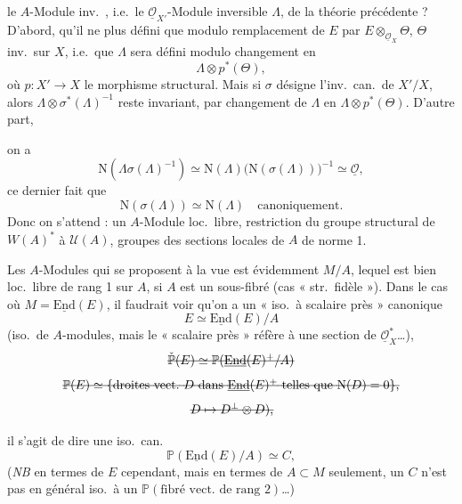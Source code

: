 \documentclass[11pt,a4paper]{article}
\begin{document}
 le $A$-Module inv.\ , i.e.\ le $\underline{\mathcal{O}}_{X'}$-Module inversible $\Lambda$, de la théorie précédente ?  D'abord, qu'il ne  plus défini que modulo remplacement de $E$ par $E \otimes_{\underline{\mathcal{O}}_X} \Theta$, $\Theta$ inv.\ sur $X$, i.e.\ que $\Lambda$ sera défini modulo changement en
\[
  \Lambda \otimes p^{*}(\Theta),
\]
où $p \colon X' \to X$ le morphisme structural. Mais si $\sigma$ désigne l'inv.\ can.\ de $X'/X$, alors $\Lambda \otimes \sigma^{*}(\Lambda)^{-1}$ reste invariant, par changement de $\Lambda$ en $\Lambda \otimes p^{*}(\Theta)$. D'autre part,

on a
\[
  \mathrm{N}(\Lambda \sigma(\Lambda)^{-1}) \simeq \mathrm{N}(\Lambda)\bigl(\mathrm{N}(\sigma(\Lambda))\bigr)^{-1} \simeq \underline{\mathcal{O}} ,
\]
 ce dernier fait que
\[
  \mathrm{N}(\sigma(\Lambda)) \simeq \mathrm{N}(\Lambda) \quad \text{canoniquement.}
\]
Donc on s'attend :  un $A$-Module loc.\ libre,  restriction du groupe structural de $W(A)^{*}$ à $\mathcal{U}(A)$,  groupes des sections locales de $A$ de norme 1.

Les $A$-Modules qui se proposent à la vue est évidemment $M/A$, lequel est bien loc.\ libre de rang 1 sur $A$, si $A$ est un sous-fibré   (cas « str.\ fidèle »).  Dans le cas où $M = \underline{\mathrm{End}}(E)$, il faudrait voir qu'on a un « iso.\ à scalaire près » canonique
\[
  E \simeq \underline{\mathrm{End}}(E)/A
\]
(iso.\ de $A$-modules, mais le « scalaire près » réfère à une section de $\underline{\mathcal{O}}_X^{*}$…), 
\[
  \text{\struck{$\check{\mathbb{P}}(E) \simeq \mathbb{P}(\underline{\mathrm{End}}(E)^{+}/A)$}}
\]
\[
  \text{\struck{$\mathbb{P}(E) \simeq \{$droites vect.\ $D$ dans $\underline{\mathrm{End}}(E)^{+}$ telles que $\mathrm{N}(D) = 0\}$,}}
\]
\[
  \text{\struck{$D \mapsto D^{\perp} \otimes D$),}}
\]

il s'agit de dire une iso.\ can.
\[
  \mathbb{P}(\underline{\mathrm{End}}(E)/A) \simeq C,
\]
\struck{\ill{}} 
(\emph{NB} en termes de $E$ cependant, mais en termes de $A \subset M$ seulement, un \struck{\ill{}} $C$ n'est pas en général iso.\ à un $\mathbb{P}(\text{fibré vect.\ de rang } 2)$…)
\end{document}
